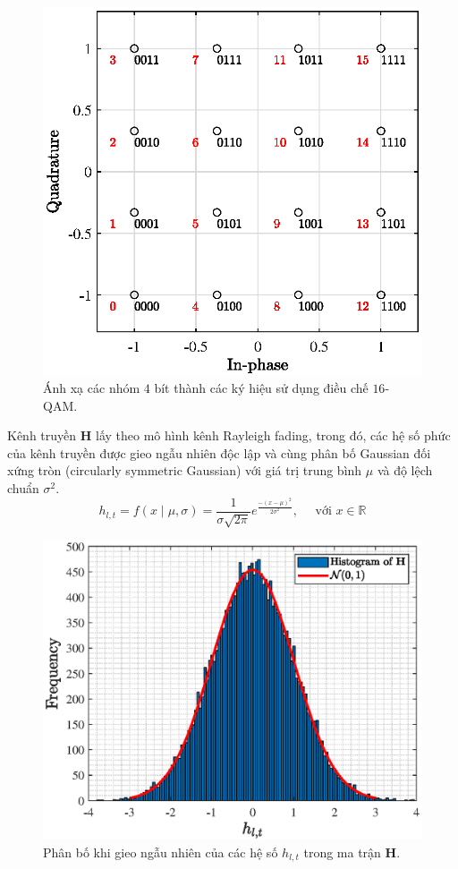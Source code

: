 \begin{figure}[ht]
    \centering
    \includegraphics[width=.8\linewidth]{figures/qam16_con.eps}
    \caption{Ánh xạ các nhóm $4$ bít thành các ký hiệu sử dụng điều chế $16$-QAM.}
    \label{fig:mapping}
\end{figure}

Kênh truyền $\mathbf{H}$ lấy theo mô hình kênh Rayleigh fading, trong đó, các hệ số phức của kênh truyền được gieo ngẫu nhiên độc lập và cùng phân bố Gaussian đối xứng tròn (circularly symmetric Gaussian) với giá trị trung bình $\mu$ và độ lệch chuẩn $\sigma^2$.
\begin{equation}
h_{l, t}=f(x \mid \mu, \sigma)=\frac{1}{\sigma \sqrt{2 \pi}} e^{\frac{-(x-\mu)^2}{2 \sigma^2}}, \quad \text { với } x \in \mathbb{R}
\end{equation}
\begin{figure}
    \centering
    \includegraphics[width=.8\linewidth]{figures/ray.eps}
    \caption{Phân bố khi gieo ngẫu nhiên của các hệ số $h_{l, t}$ trong ma trận $\mathbf{H}$.}
    \label{fig:ray}
\end{figure}

